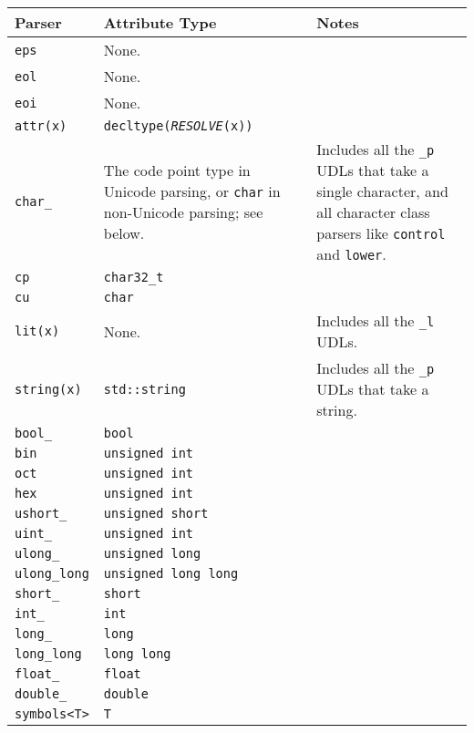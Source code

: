 \begin{longtable}[]{@{}lll@{}}
\toprule\noalign{}
Parser & Attribute Type & Notes \\
\midrule\noalign{}
\endhead
\bottomrule\noalign{}
\endlastfoot
\texttt{eps} & None. & \\
\texttt{eol} & None. & \\
\texttt{eoi} & None. & \\
\texttt{attr(x)} & \texttt{decltype(}\emph{\texttt{RESOLVE}}\texttt{(x))} & \\
\texttt{char\_} & The code point type in Unicode parsing, or \texttt{char} in non-Unicode parsing; see below. & Includes all the \texttt{\_p} UDLs that take a single character, and all character class parsers like \texttt{control} and \texttt{lower}. \\
\texttt{cp} & \texttt{char32\_t} & \\
\texttt{cu} & \texttt{char} & \\
\texttt{lit(x)} & None. & Includes all the \texttt{\_l} UDLs. \\
\texttt{string(x)} & \texttt{std::string} & Includes all the \texttt{\_p} UDLs that take a string. \\
\texttt{bool\_} & \texttt{bool} & \\
\texttt{bin} & \texttt{unsigned int} & \\
\texttt{oct} & \texttt{unsigned int} & \\
\texttt{hex} & \texttt{unsigned int} & \\
\texttt{ushort\_} & \texttt{unsigned short} & \\
\texttt{uint\_} & \texttt{unsigned int} & \\
\texttt{ulong\_} & \texttt{unsigned long} & \\
\texttt{ulong\_long} & \texttt{unsigned long long} & \\
\texttt{short\_} & \texttt{short} & \\
\texttt{int\_} & \texttt{int} & \\
\texttt{long\_} & \texttt{long} & \\
\texttt{long\_long} & \texttt{long long} & \\
\texttt{float\_} & \texttt{float} & \\
\texttt{double\_} & \texttt{double} & \\
\texttt{symbols<T>} & \texttt{T} & \\
\end{longtable}

\hfill\break

